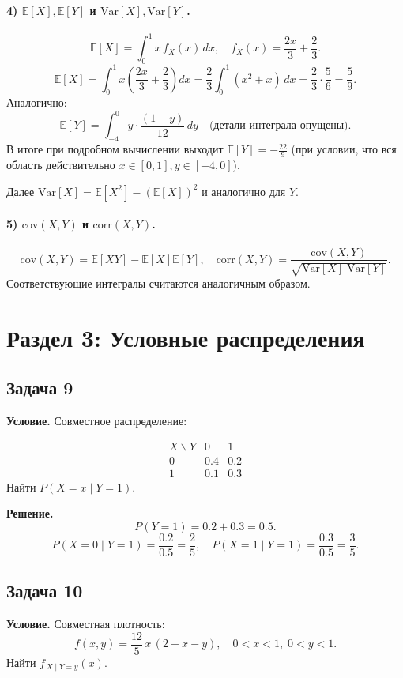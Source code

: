 \documentclass[12pt]{article}
\begin{document}
\paragraph{4) \(\mathbb{E}[X], \mathbb{E}[Y]\) и \(\mathrm{Var}[X], \mathrm{Var}[Y]\).}
\[
\mathbb{E}[X]=\int_0^1 x\,f_X(x)\,dx, \quad
f_X(x)=\frac{2x}{3}+\frac{2}{3}.
\]
\[
\mathbb{E}[X]=\int_0^1 x\left(\frac{2x}{3}+\frac{2}{3}\right)dx
=\frac{2}{3}\int_0^1(x^2+x)\,dx=\frac{2}{3}\cdot\frac{5}{6}=\frac{5}{9}.
\]
Аналогично:
\[
\mathbb{E}[Y]=\int_{-4}^0 y\cdot\frac{(1-y)}{12}\,dy \quad\text{(детали интеграла опущены)}.
\]
В итоге при подробном вычислении выходит \(\mathbb{E}[Y] = -\frac{22}{9}\) (при условии, что вся область действительно \(x\in[0,1], y\in[-4,0]\)).  

Далее \(\mathrm{Var}[X]=\mathbb{E}[X^2]-(\mathbb{E}[X])^2\) и аналогично для \(Y\).  

\paragraph{5) \(\mathrm{cov}(X,Y)\) и \(\mathrm{corr}(X,Y)\).}
\[
\mathrm{cov}(X,Y)=\mathbb{E}[XY]-\mathbb{E}[X]\mathbb{E}[Y],\quad
\mathrm{corr}(X,Y)=\frac{\mathrm{cov}(X,Y)}{\sqrt{\mathrm{Var}[X]\;\mathrm{Var}[Y]}}.
\]
Соответствующие интегралы считаются аналогичным образом.

\section*{Раздел 3: Условные распределения}

\subsection*{Задача 9}
\textbf{Условие.} Совместное распределение:

\[
\begin{array}{c|cc}
X\backslash Y & 0 & 1 \\
\hline
0 & 0.4 & 0.2 \\
1 & 0.1 & 0.3
\end{array}
\]
Найти \(P(X=x\mid Y=1)\).

\textbf{Решение.}  
\[
P(Y=1)=0.2+0.3=0.5.
\]
\[
P(X=0\mid Y=1)=\frac{0.2}{0.5}=\frac{2}{5},\quad
P(X=1\mid Y=1)=\frac{0.3}{0.5}=\frac{3}{5}.
\]

\subsection*{Задача 10}
\textbf{Условие.} Совместная плотность:
\[
f(x,y)=\frac{12}{5}\,x\,(2-x-y),\quad 0<x<1,\;0<y<1.
\]
Найти \(f_{\,X\mid Y=y}(x)\).
\end{document}
